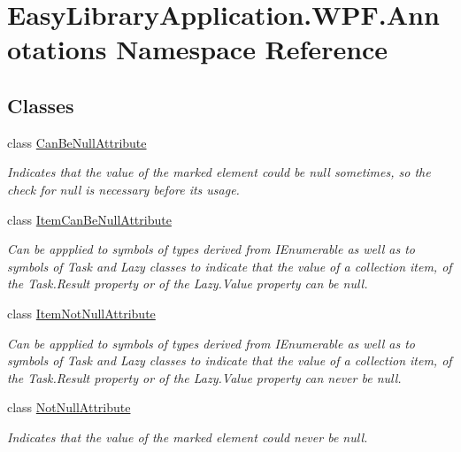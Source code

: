 \hypertarget{namespace_easy_library_application_1_1_w_p_f_1_1_annotations}{}\section{Easy\+Library\+Application.\+W\+P\+F.\+Annotations Namespace Reference}
\label{namespace_easy_library_application_1_1_w_p_f_1_1_annotations}
\subsection*{Classes}
\begin{DoxyCompactItemize}
\item 
class \mbox{\hyperlink{class_easy_library_application_1_1_w_p_f_1_1_annotations_1_1_can_be_null_attribute}{Can\+Be\+Null\+Attribute}}
\begin{DoxyCompactList}\small\item\em Indicates that the value of the marked element could be {\ttfamily null} sometimes, so the check for {\ttfamily null} is necessary before its usage. \end{DoxyCompactList}\item 
class \mbox{\hyperlink{class_easy_library_application_1_1_w_p_f_1_1_annotations_1_1_item_can_be_null_attribute}{Item\+Can\+Be\+Null\+Attribute}}
\begin{DoxyCompactList}\small\item\em Can be appplied to symbols of types derived from I\+Enumerable as well as to symbols of Task and Lazy classes to indicate that the value of a collection item, of the Task.\+Result property or of the Lazy.\+Value property can be null. \end{DoxyCompactList}\item 
class \mbox{\hyperlink{class_easy_library_application_1_1_w_p_f_1_1_annotations_1_1_item_not_null_attribute}{Item\+Not\+Null\+Attribute}}
\begin{DoxyCompactList}\small\item\em Can be appplied to symbols of types derived from I\+Enumerable as well as to symbols of Task and Lazy classes to indicate that the value of a collection item, of the Task.\+Result property or of the Lazy.\+Value property can never be null. \end{DoxyCompactList}\item 
class \mbox{\hyperlink{class_easy_library_application_1_1_w_p_f_1_1_annotations_1_1_not_null_attribute}{Not\+Null\+Attribute}}
\begin{DoxyCompactList}\small\item\em Indicates that the value of the marked element could never be {\ttfamily null}. \end{DoxyCompactList}\end{DoxyCompactItemize}
